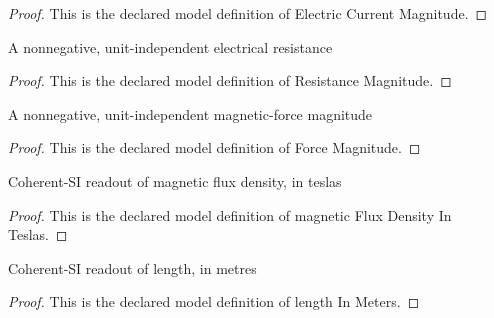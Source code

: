 \begin{proof}
  This is the declared model definition of Electric Current Magnitude.
\end{proof}
\begin{definition}
  \label{def:physics:phyx-mini-0937:phyxminiproblems-problemphyxmini0937-resistancemagnitude}
  A nonnegative, unit-independent electrical resistance
\end{definition}
\begin{proof}
  This is the declared model definition of Resistance Magnitude.
\end{proof}
\begin{definition}
  \label{def:physics:phyx-mini-0937:phyxminiproblems-problemphyxmini0937-forcemagnitude}
  A nonnegative, unit-independent magnetic-force magnitude
\end{definition}
\begin{proof}
  This is the declared model definition of Force Magnitude.
\end{proof}
\begin{definition}
  \label{def:physics:phyx-mini-0937:phyxminiproblems-problemphyxmini0937-magneticfluxdensityinteslas}
  Coherent-SI readout of magnetic flux density, in teslas
\end{definition}
\begin{proof}
  This is the declared model definition of magnetic Flux Density In Teslas.
\end{proof}
\begin{definition}
  \label{def:physics:phyx-mini-0937:phyxminiproblems-problemphyxmini0937-lengthinmeters}
  Coherent-SI readout of length, in metres
\end{definition}
\begin{proof}
  This is the declared model definition of length In Meters.
\end{proof}
